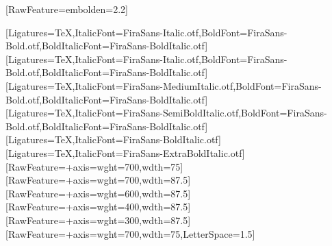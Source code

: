 \usepackage{fontspec}
\usepackage{xcolor}
\usepackage{graphicx}
\usepackage{amsmath,amssymb}
\usepackage{unicode-math}
[RawFeature={embolden=2.2}]
\usepackage{tikz}
\usetikzlibrary{calc,arrows.meta,shapes.geometric,decorations.pathmorphing,shadows}


\setmainfont{FiraSans-Regular.otf}[Ligatures=TeX,ItalicFont=FiraSans-Italic.otf,BoldFont=FiraSans-Bold.otf,BoldItalicFont=FiraSans-BoldItalic.otf]
\setsansfont{FiraSans-Regular.otf}[Ligatures=TeX,ItalicFont=FiraSans-Italic.otf,BoldFont=FiraSans-Bold.otf,BoldItalicFont=FiraSans-BoldItalic.otf]
\newfontfamily{}[Ligatures=TeX,ItalicFont=FiraSans-MediumItalic.otf,BoldFont=FiraSans-Bold.otf,BoldItalicFont=FiraSans-BoldItalic.otf]
\newfontfamily{}[Ligatures=TeX,ItalicFont=FiraSans-SemiBoldItalic.otf,BoldFont=FiraSans-Bold.otf,BoldItalicFont=FiraSans-BoldItalic.otf]
\newfontfamily{}[Ligatures=TeX,ItalicFont=FiraSans-BoldItalic.otf]
\newfontfamily{}[Ligatures=TeX,ItalicFont=FiraSans-ExtraBoldItalic.otf]
\newfontfamily{}[RawFeature={+axis={wght=700,wdth=75}}]
\newfontfamily{}[RawFeature={+axis={wght=700,wdth=87.5}}]
\newfontfamily{}[RawFeature={+axis={wght=600,wdth=87.5}}]
\newfontfamily{}[RawFeature={+axis={wght=400,wdth=87.5}}]
\newfontfamily{}[RawFeature={+axis={wght=300,wdth=87.5}}]
\newfontfamily{}[RawFeature={+axis={wght=700,wdth=75}},LetterSpace=1.5]

